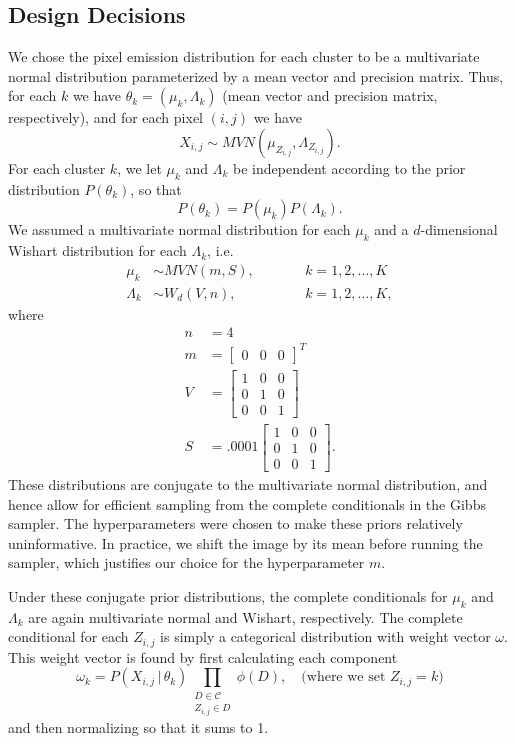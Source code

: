 \documentclass[12pt]{article}
\begin{document}
\subsection*{Design Decisions}
We chose the pixel emission distribution for each cluster to be a multivariate normal
distribution parameterized by a mean vector and precision matrix.
Thus, for each $k$ we have $\theta_k = (\mu_k, \Lambda_k)$ (mean vector and precision matrix,
respectively), and for each pixel $(i,j)$
we have
\[
X_{i,j} \sim MVN(\mu_{Z_{i,j}}, \Lambda_{Z_{i,j}}).
\]
For each cluster $k$, we let $\mu_k$ and $\Lambda_k$ be independent according
to the prior distribution $P(\theta_k)$, so that
\[
P(\theta_k) = P(\mu_k)P(\Lambda_k).
\]
We assumed a multivariate normal distribution for each $\mu_k$ and a
$d$-dimensional Wishart distribution for each $\Lambda_k$, i.e.
\begin{align*}
\mu_k &\sim MVN(m,S), \qquad && k=1,2,\ldots,K\\
\Lambda_k &\sim W_d(V,n), &&k=1,2,\ldots,K,
\end{align*}
where
\begin{align*}
n &= 4\\
m &= \begin{bmatrix}
0 & 0 & 0
\end{bmatrix}^T\\
V &= \begin{bmatrix}
1 & 0 & 0\\
0 & 1 & 0\\
0 & 0 & 1
\end{bmatrix}\\
S &= .0001\begin{bmatrix}
1 & 0 & 0\\
0 & 1 & 0\\
0 & 0 & 1
\end{bmatrix}.
\end{align*}
These distributions are conjugate to the multivariate normal distribution, and hence allow for
efficient sampling from the complete conditionals in the Gibbs sampler. The hyperparameters
were chosen to make these priors relatively uninformative.
In practice, we shift the image by its mean before running the sampler,
which justifies our choice for the hyperparameter $m$.

Under these conjugate prior distributions, the complete conditionals for $\mu_k$ and $\Lambda_k$
are again multivariate normal and Wishart, respectively.
The complete conditional for each $Z_{i,j}$ is simply a categorical distribution with weight
vector $\omega$. This weight vector is found by first calculating each component
\[
\omega_k = P(X_{i,j}\,|\,\theta_k)
\prod_{\substack{D \in \mathcal{C}\\
        Z_{i,j} \in D}}\phi(D), \quad \text{(where we set $Z_{i,j}=k$)}
\]
and then normalizing so that it sums to 1.
\end{document}
